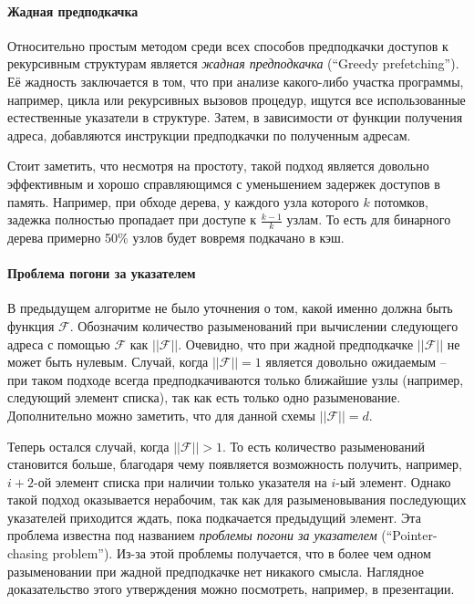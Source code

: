 \documentclass[12pt,a4paper,oneside]{article}
\begin{document}
\paragraph{Жадная предподкачка}

Относительно простым методом среди всех способов предподкачки доступов к рекурсивным структурам является \emph{жадная предподкачка} (``Greedy prefetching''). Её жадность заключается в том, что при анализе какого-либо участка программы, например, цикла или рекурсивных вызовов процедур, ищутся все использованные естественные указатели в структуре. Затем, в зависимости от функции получения адреса, добавляются инструкции предподкачки по полученным адресам.

Стоит заметить, что несмотря на простоту, такой подход является довольно эффективным и хорошо справляющимся с уменьшением задержек доступов в память. Например, при обходе дерева, у каждого узла которого $k$ потомков, задежка полностью пропадает при доступе к $\frac{k-1}{k}$ узлам. То есть для бинарного дерева примерно 50\% узлов будет вовремя подкачано в кэш.

\paragraph{Проблема погони за указателем}

В предыдущем алгоритме не было уточнения о том, какой именно должна быть функция $\mathcal{F}$. Обозначим количество разыменований при вычислении следующего адреса с помощью $\mathcal{F}$ как $||\mathcal{F}||$. Очевидно, что при жадной предподкачке $||\mathcal{F}||$ не может быть нулевым. Случай, когда $||\mathcal{F}|| = 1$ является довольно ожидаемым -- при таком подходе всегда предподкачиваются только ближайшие узлы (например, следующий элемент списка), так как есть только одно разыменование. Дополнительно можно заметить, что для данной схемы $||\mathcal{F}|| = d$.

Теперь остался случай, когда $||\mathcal{F}|| > 1$. То есть количество разыменований становится больше, благодаря чему появляется возможность получить, например, $i+2$-ой элемент списка при наличии только указателя на $i$-ый элемент. Однако такой подход оказывается нерабочим, так как для разыменовывания последующих указателей приходится ждать, пока подкачается предыдущий элемент. Эта проблема известна под названием \emph{проблемы погони за указателем} (``Pointer-chasing problem''). Из-за этой проблемы получается, что в более чем одном разыменовании при жадной предподкачке нет никакого смысла. Наглядное доказательство этого утверждения можно посмотреть, например, в презентации\cite{MowryChasing}.
\end{document}
